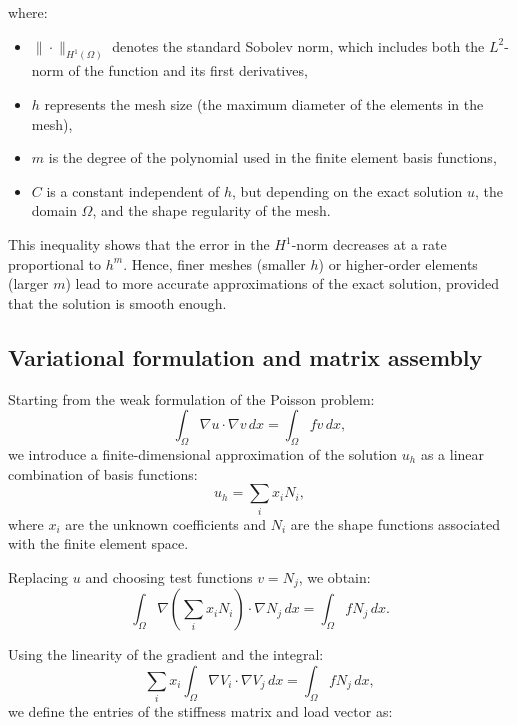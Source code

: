 \documentclass[12pt]{article}
\begin{document}
where:
\begin{itemize}
    \item \( \| \cdot \|_{H^1(\Omega)} \) denotes the standard Sobolev norm, which includes both the \( L^2 \)-norm of the function and its first derivatives,
    \item \( h \) represents the mesh size (the maximum diameter of the elements in the mesh),
    \item \( m \) is the degree of the polynomial used in the finite element basis functions,
    \item \( C \) is a constant independent of \( h \), but depending on the exact solution \( u \), the domain \( \Omega \), and the shape regularity of the mesh.
\end{itemize}

This inequality shows that the error in the \( H^1 \)-norm decreases at a rate proportional to \( h^m \). Hence, finer meshes (smaller \( h \)) or higher-order elements (larger \( m \)) lead to more accurate approximations of the exact solution, provided that the solution is smooth enough.

\subsection*{Variational formulation and matrix assembly}

Starting from the weak formulation of the Poisson problem:
\begin{equation}
\int_\Omega \nabla u \cdot \nabla v \, dx = \int_\Omega f v \, dx,
\end{equation}
we introduce a finite-dimensional approximation of the solution \( u_h \) as a linear combination of basis functions:
\begin{equation}
u_h = \sum_i x_i N_i,
\end{equation}
where \( x_i \) are the unknown coefficients and \( N_i \) are the shape functions associated with the finite element space.

Replacing \( u \) and choosing test functions \( v = N_j \), we obtain:
\begin{equation}
\int_\Omega \nabla \left( \sum_i x_i N_i \right) \cdot \nabla N_j \, dx = \int_\Omega f N_j \, dx.
\end{equation}

Using the linearity of the gradient and the integral:
\begin{equation}
\sum_i x_i \int_\Omega \nabla V_i \cdot \nabla V_j \, dx = \int_\Omega f N_j \, dx,
\end{equation}
we define the entries of the stiffness matrix and load vector as:
\end{document}
